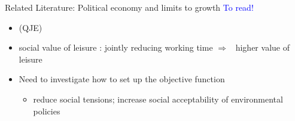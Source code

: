 \documentclass[11pt,aspectratio=169]{beamer}
\newcommand{\tr}[1]{\textcolor{blue}{#1}}
\newcommand{\ar}{$\Rightarrow$ \ }
\begin{document}
\begin{frame}{Related Literature: Political economy and limits to growth}
\tr{To read!}
\begin{itemize}
\item \cite{Alesina1994DistributiveGrowth}(QJE)

\item social value of leisure \citep{Alesina2005WorkDifferent}: jointly reducing working time \ar higher value of leisure
\item \alert{Need to investigate how to set up the objective function} 
\begin{itemize}
\item reduce social tensions; increase social acceptability of environmental policies
\end{itemize}
\end{itemize}

\end{frame}
\end{document}
